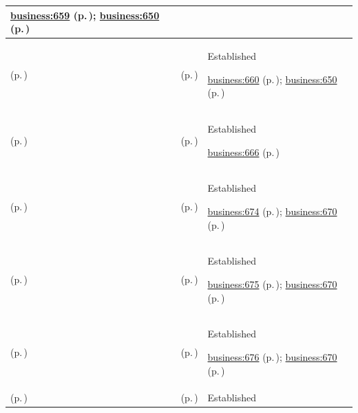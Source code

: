 \begin{longtable}{|>{\raggedright\arraybackslash}p{0.27\TableWidth}|>{\raggedright\arraybackslash}p{0.27\TableWidth}|>{\raggedright\arraybackslash}p{0.46\TableWidth}|}
 \hyperref[rad:business:652]{business:659} (p.\,\pageref{rad:business:652}); \hyperref[rad:business:650]{business:650} (p.\,\pageref{rad:business:650})\\\hline
\nameref{cap:bc-health-information-management} (p.\,\pageref{cap:bc-health-information-management}) & \nameref{cap:bc-health-information-data-retrieval} (p.\,\pageref{cap:bc-health-information-data-retrieval}) & Established

 \hyperref[rad:business:652]{business:660} (p.\,\pageref{rad:business:652}); \hyperref[rad:business:650]{business:650} (p.\,\pageref{rad:business:650})\\\hline
\nameref{cap:bc-health-information-knowledge-management} (p.\,\pageref{cap:bc-health-information-knowledge-management}) & \nameref{cap:bc-clinical-knowledge-management} (p.\,\pageref{cap:bc-clinical-knowledge-management}) & Established

 \hyperref[rad:business:666]{business:666} (p.\,\pageref{rad:business:666})\\\hline
\nameref{cap:bc-clinical-knowledge-management} (p.\,\pageref{cap:bc-clinical-knowledge-management}) & \nameref{cap:bc-clinical-knowledge-context-identification} (p.\,\pageref{cap:bc-clinical-knowledge-context-identification}) & Established

 \hyperref[rad:business:672]{business:674} (p.\,\pageref{rad:business:672}); \hyperref[rad:business:670]{business:670} (p.\,\pageref{rad:business:670})\\\hline
\nameref{cap:bc-clinical-knowledge-management} (p.\,\pageref{cap:bc-clinical-knowledge-management}) & \nameref{cap:bc-clinical-knowledge-context-extraction} (p.\,\pageref{cap:bc-clinical-knowledge-context-extraction}) & Established

 \hyperref[rad:business:672]{business:675} (p.\,\pageref{rad:business:672}); \hyperref[rad:business:670]{business:670} (p.\,\pageref{rad:business:670})\\\hline
\nameref{cap:bc-clinical-knowledge-management} (p.\,\pageref{cap:bc-clinical-knowledge-management}) & \nameref{cap:bc-clinical-knowledge-information-formulation} (p.\,\pageref{cap:bc-clinical-knowledge-information-formulation}) & Established

 \hyperref[rad:business:672]{business:676} (p.\,\pageref{rad:business:672}); \hyperref[rad:business:670]{business:670} (p.\,\pageref{rad:business:670})\\\hline
\nameref{cap:bc-clinical-knowledge-management} (p.\,\pageref{cap:bc-clinical-knowledge-management}) & \nameref{cap:bc-clinical-knowledge-concept-association} (p.\,\pageref{cap:bc-clinical-knowledge-concept-association}) & Established


\end{longtable}
